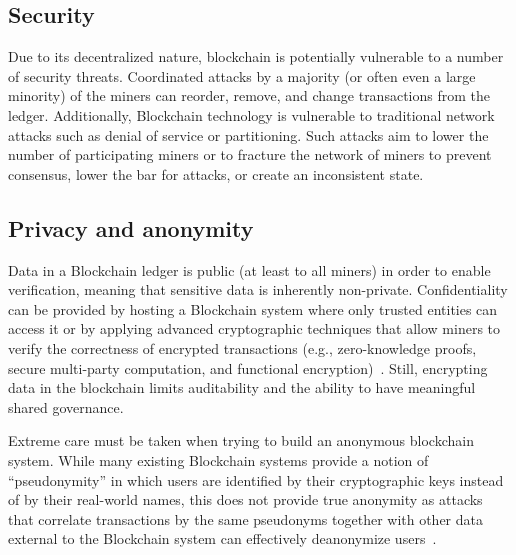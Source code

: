 \subsection{Security}
Due to its decentralized nature, blockchain is potentially vulnerable to a number of security threats.
Coordinated attacks by a majority (or often even a large minority) of the miners can reorder, remove, and change transactions from the ledger. 
Additionally, Blockchain technology is vulnerable to traditional network attacks such as denial of service or partitioning.
Such attacks aim to lower the number of participating miners or to fracture the network of miners to prevent consensus, lower the bar for attacks, or create an inconsistent state.

\subsection{Privacy and anonymity}
Data in a Blockchain ledger is public (at least to all miners) in order to enable verification, meaning that sensitive data is inherently non-private.
Confidentiality can be provided by hosting a Blockchain system where only trusted entities can access it or by applying advanced cryptographic techniques that allow miners to verify the correctness of encrypted transactions (e.g., zero-knowledge proofs, secure multi-party computation, and functional encryption)~\cite{SP:KMSWP16}.
Still, encrypting data in the blockchain limits auditability and the ability to have 
meaningful shared governance.

Extreme care must be taken when trying to build an anonymous blockchain system.
While many existing Blockchain systems provide a notion of ``pseudonymity'' in which users are identified by their cryptographic keys instead of by their real-world names, this does not provide true anonymity as attacks that correlate transactions by the same pseudonyms together with other data external to the Blockchain system can effectively deanonymize users~\cite{DBLP:journals/corr/abs-1708-04748}.

